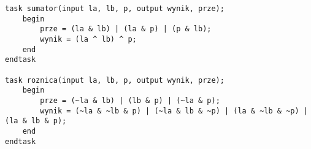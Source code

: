\begin{lstlisting}
task sumator(input la, lb, p, output wynik, prze);
	begin
		prze = (la & lb) | (la & p) | (p & lb);
		wynik = (la ^ lb) ^ p;
	end
endtask

task roznica(input la, lb, p, output wynik, prze);
	begin
		prze = (~la & lb) | (lb & p) | (~la & p);
		wynik = (~la & ~lb & p) | (~la & lb & ~p) | (la & ~lb & ~p) | (la & lb & p);
	end
endtask
\end{lstlisting}